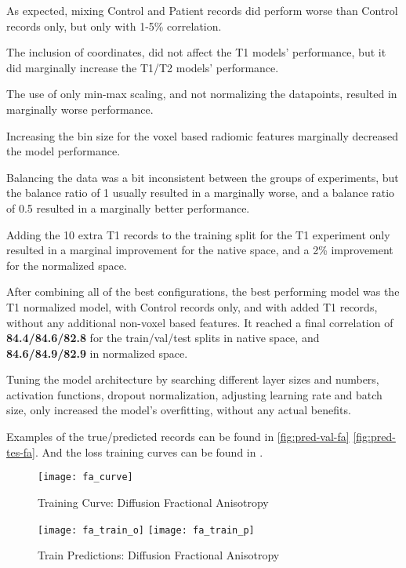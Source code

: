 As expected, mixing Control and Patient records did perform worse than Control records only, but only with 1-5\% correlation.\par
The inclusion of coordinates, did not affect the T1 models' performance, but it did marginally increase the T1/T2 models' performance.\par
The use of only min-max scaling, and not normalizing the datapoints, resulted in marginally worse performance.\par
Increasing the bin size for the voxel based radiomic features marginally decreased the model performance.\par
Balancing the data was a bit inconsistent between the groups of experiments, but the balance ratio of 1 usually resulted in a marginally worse, and a balance ratio of 0.5 resulted in a marginally better performance.\par
Adding the 10 extra T1 records to the training split for the T1 experiment only resulted in a marginal improvement for the native space, and a 2\% improvement for the normalized space.\par
After combining all of the best configurations, the best performing model was the T1 normalized model, with Control records only, and with added T1 records, without any additional non-voxel based features. It reached a final correlation of \textbf{84.4/84.6/82.8} for the train/val/test splits in native space, and \textbf{84.6/84.9/82.9} in normalized space.\par
Tuning the model architecture by searching different layer sizes and numbers, activation functions, dropout normalization, adjusting learning rate and batch size, only increased the model’s overfitting, without any actual benefits.\par
Examples of the true/predicted records can be found in  \ref{fig:pred-val-fa} \ref{fig:pred-tes-fa}. And the loss training curves can be found in .

\begin{figure}[H]
\centering
\texttt{[image: fa\_curve]}
\caption{Training Curve: Diffusion Fractional Anisotropy}
\label{fig:curve-fa}
\end{figure}

\begin{figure}[H]
\centering
\texttt{[image: fa\_train\_o]}
\texttt{[image: fa\_train\_p]}
\caption{Train Predictions: Diffusion Fractional Anisotropy}
\label{fig:pred-tra-fa}
\end{figure}

